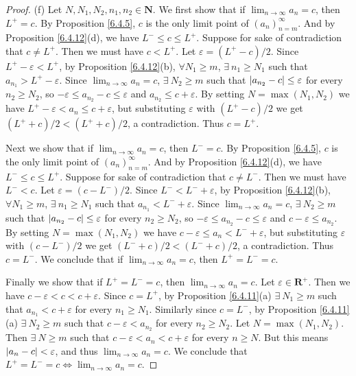 \begin{proof}{(f)}
    Let \(N, N_1, N_2, n_1, n_2 \in \mathbf{N}\).
    We first show that if \(\lim_{n \to \infty} a_n = c\), then \(L^+ = c\).
    By Proposition \ref{6.4.5}, \(c\) is the only limit point of \((a_n)_{n = m}^\infty\).
    And by Proposition \ref{6.4.12}(d), we have \(L^- \leq c \leq L^+\).
    Suppose for sake of contradiction that \(c \neq L^+\).
    Then we must have \(c < L^+\).
    Let \(\varepsilon = (L^+ - c) / 2\).
    Since \(L^+ - \varepsilon < L^+\), by Proposition \ref{6.4.12}(b), \(\forall N_1 \geq m\), \(\exists\ n_1 \geq N_1\) such that \(a_{n_1} > L^+ - \varepsilon\).
    Since \(\lim_{n \to \infty} a_n = c\), \(\exists\ N_2 \geq m\) such that \(\abs*{a_{n_2} - c} \leq \varepsilon\) for every \(n_2 \geq N_2\), so \(-\varepsilon \leq a_{n_2} - c \leq \varepsilon\) and \(a_{n_2} \leq c + \varepsilon\).
    By setting \(N = \max(N_1, N_2)\) we have \(L^+ - \varepsilon < a_n \leq c + \varepsilon\), but substituting \(\varepsilon\) with \((L^+ - c) / 2\) we get \((L^+ + c) / 2 < (L^+ + c) / 2\), a contradiction.
    Thus \(c = L^+\).

    Next we show that if \(\lim_{n \to \infty} a_n = c\), then \(L^- = c\).
    By Proposition \ref{6.4.5}, \(c\) is the only limit point of \((a_n)_{n = m}^\infty\).
    And by Proposition \ref{6.4.12}(d), we have \(L^- \leq c \leq L^+\).
    Suppose for sake of contradiction that \(c \neq L^-\).
    Then we must have \(L^- < c\).
    Let \(\varepsilon = (c - L^-) / 2\).
    Since \(L^- < L^- + \varepsilon\), by Proposition \ref{6.4.12}(b), \(\forall N_1 \geq m\), \(\exists\ n_1 \geq N_1\) such that \(a_{n_1} < L^- + \varepsilon\).
    Since \(\lim_{n \to \infty} a_n = c\), \(\exists\ N_2 \geq m\) such that \(\abs*{a_{n_2} - c} \leq \varepsilon\) for every \(n_2 \geq N_2\), so \(-\varepsilon \leq a_{n_2} - c \leq \varepsilon\) and \(c - \varepsilon \leq a_{n_2}\).
    By setting \(N = \max(N_1, N_2)\) we have \(c - \varepsilon \leq a_n < L^- + \varepsilon\), but substituting \(\varepsilon\) with \((c - L^-) / 2\) we get \((L^- + c) / 2 < (L^- + c) / 2\), a contradiction.
    Thus \(c = L^-\).
    We conclude that if \(\lim_{n \to \infty} a_n = c\), then \(L^+ = L^- = c\).

    Finally we show that if \(L^+ = L^- = c\), then \(\lim_{n \to \infty} a_n = c\).
    Let \(\varepsilon \in \mathbf{R}^+\).
    Then we have \(c - \varepsilon < c < c + \varepsilon\).
    Since \(c = L^+\), by Proposition \ref{6.4.11}(a) \(\exists\ N_1 \geq m\) such that \(a_{n_1} < c + \varepsilon\) for every \(n_1 \geq N_1\).
    Similarly since \(c = L^-\), by Proposition \ref{6.4.11}(a) \(\exists\ N_2 \geq m\) such that \(c - \varepsilon < a_{n_2}\) for every \(n_2 \geq N_2\).
    Let \(N = \max(N_1, N_2)\).
    Then \(\exists\ N \geq m\) such that \(c - \varepsilon < a_n < c + \varepsilon\) for every \(n \geq N\).
    But this means \(\abs*{a_n - c} < \varepsilon\), and thus \(\lim_{n \to \infty} a_n = c\).
    We conclude that \(L^+ = L^- = c \iff \lim_{n \to \infty} a_n = c\).
\end{proof}

